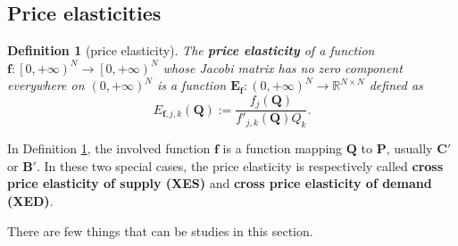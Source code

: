 \documentclass{article}
\newtheorem{definition}{Definition}[subsection]
\begin{document}
\subsection{Price elasticities}

\begin{definition}[price elasticity]
\label{multi price elasticity}
The \textbf{price elasticity} of a function $\mathbf f:\left[0,+\infty\right)^N\to\left[0,+\infty\right)^N$ whose Jacobi matrix has no zero component everywhere on $\left(0,+\infty\right)^N$ is a function $\mathbf E_\mathbf f:\left(0,+\infty\right)^N\to\mathbb R^{N\times N}$ defined as
$$E_{\mathbf f,j,k}\left(\mathbf Q\right):=\frac{f_j\left(\mathbf Q\right)}{f'_{j,k}\left(\mathbf Q\right)Q_k}.$$
\end{definition}

In Definition \ref{multi price elasticity}, the involved function $\mathbf f$ is a function mapping $\mathbf Q$ to $\mathbf P$,
usually $\mathbf C'$ or $\mathbf B'$.
In these two special cases, the price elasticity is respectively called \textbf{cross price elasticity of supply (XES)} and \textbf{cross price elasticity of demand (XED)}.

There are few things that can be studies in this section.



\end{document}
